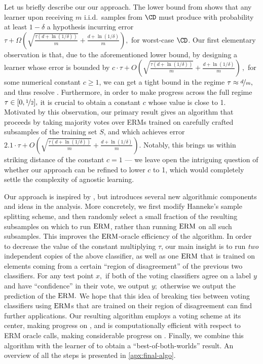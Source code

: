 Let us briefly describe our our approach. The lower bound from \citet{devroye1996probabilistic}
shows that any learner upon receiving $m$ i.i.d.\ samples from $\CD$ must produce with probability
at least \linebreak 
$1-\delta$ a hypothesis incurring error
$ \tau + \Omega\left(\sqrt{\frac{\tau(d + \ln(1/\delta))}{m}} + \frac{d + \ln(1/\delta)}{m} \right), 
$
for worst-case $\CD$. 
Our first elementary observation is that, due to the aforementioned
lower bound, by designing a learner whose error is bounded by 
$  c\cdot \tau + O\left(\sqrt{\frac{\tau(d + \ln(1/\delta))}{m}} + \frac{d + \ln(1/\delta)}{m} \right)\,,
$
for some numerical constant $c \geq 1$, we can get a tight bound
in the regime $\tau \approx \nicefrac{d}{m},$ and thus
resolve . 
Furthermore, in order to make progress across the full regime $\tau \in [0,\nicefrac{1}{2}],$ it is crucial to obtain a constant $c$ whose value is close to 1. 
Motivated by this observation, our primary result gives an algorithm that
proceeds by taking 
majority votes over ERMs trained on carefully crafted subsamples of the training set $S$, and which achieves error  $2.1 \cdot \tau + O\left(\sqrt{\frac{\tau(d + \ln(1/\delta))}{m}} + \frac{d + \ln(1/\delta)}{m} \right)$. 
Notably, this brings us within striking distance of the constant $c = 1$ --- we leave open the intriguing question of whether our approach can be refined to lower $c$ to 1, which would completely settle the complexity of agnostic learning. 

{Our approach is inspired by \citet{hanneke2016optimal},
but introduces several new algorithmic components and ideas in the analysis. More concretely, we first modify Hanneke's sample splitting scheme, 
and then randomly select a small fraction of the resulting subsamples on which to run $\mathrm{ERM}$, rather than running $\mathrm{ERM}$ on all such subsamples. This improves the $\mathrm{ERM}$-oracle efficiency of the algorithm.
In order to decrease the value of the constant multiplying $\tau$, our main insight is to run \emph{two} independent copies of the above classifier, as well as one $\mathrm{ERM}$
that is trained on elements coming from a certain ``region of disagreement'' of the previous two classifiers. For any test point $x,$ if both of the voting
classifiers agree on a label $y$ and have ``confidence'' in their vote, we output $y;$ otherwise we output the prediction of the
$\mathrm{ERM}.$ We hope that this idea of breaking ties between
voting classifiers using $\mathrm{ERM}$s that are trained on their
region of disagreement can find further applications.
} 
{Our resulting algorithm employs a voting scheme at its center, making progress on , and is  computationally efficient with respect to ERM oracle calls, making considerable progress on .}
Finally, we combine this algorithm with the learner of \citet{hanneke2024revisiting} to obtain a ``best-of-both-worlds'' result. {An overview of all the steps is presented in \cref{apx:final-algo}.}

